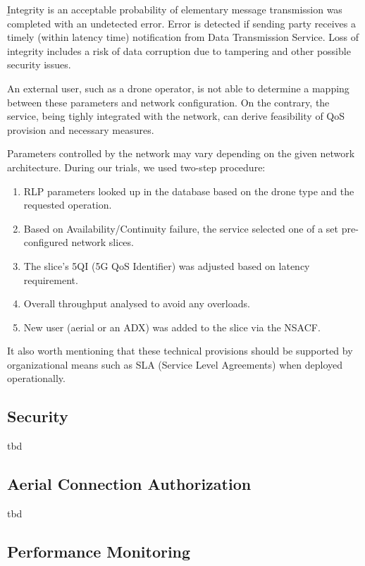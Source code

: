 \documentclass[a4paper,conference]{IEEEtran}
\begin{document}
{\b Integrity} is an acceptable probability of elementary message transmission was completed with an undetected error. Error is detected if sending party receives a timely (within latency time) notification from Data Transmission Service. Loss of integrity includes a risk of data corruption due to tampering and other possible security issues.

An external user, such as a drone operator, is not able to determine a mapping between these parameters and network configuration. On the contrary, the service, being tighly integrated with the network, can derive feasibility of QoS provision and necessary measures.

Parameters controlled by the network may vary depending on the given network architecture. During our trials, we used two-step procedure:

\begin{enumerate}
\item RLP parameters looked up in the database based on the drone type and the requested operation.
\item Based on Availability/Continuity failure, the service selected one of a set pre-configured network slices.
\item The slice's 5QI (5G QoS Identifier) was adjusted based on latency requirement.
\item Overall throughput analysed to avoid any overloads.
\item New user (aerial or an ADX) was added to the slice via the NSACF.
\end{enumerate}

It also worth mentioning that these technical provisions should be supported by organizational means such as SLA (Service Level Agreements) when deployed operationally.

\subsection{Security}

tbd

\subsection{Aerial Connection Authorization}

tbd

\subsection{Performance Monitoring}
\end{document}
